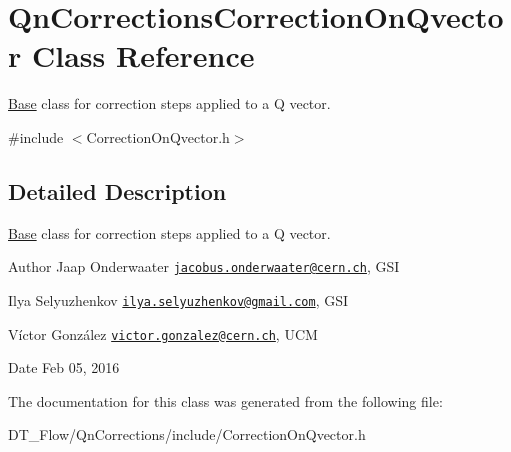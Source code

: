 \hypertarget{classQnCorrectionsCorrectionOnQvector}{}\section{Qn\+Corrections\+Correction\+On\+Qvector Class Reference}
\label{classQnCorrectionsCorrectionOnQvector}


\mbox{\hyperlink{classBase}{Base}} class for correction steps applied to a Q vector.  




{\ttfamily \#include $<$Correction\+On\+Qvector.\+h$>$}



\subsection{Detailed Description}
\mbox{\hyperlink{classBase}{Base}} class for correction steps applied to a Q vector. 

\begin{DoxyAuthor}{Author}
Jaap Onderwaater \href{mailto:jacobus.onderwaater@cern.ch}{\tt jacobus.\+onderwaater@cern.\+ch}, G\+SI 

Ilya Selyuzhenkov \href{mailto:ilya.selyuzhenkov@gmail.com}{\tt ilya.\+selyuzhenkov@gmail.\+com}, G\+SI 

Víctor González \href{mailto:victor.gonzalez@cern.ch}{\tt victor.\+gonzalez@cern.\+ch}, U\+CM 
\end{DoxyAuthor}
\begin{DoxyDate}{Date}
Feb 05, 2016 
\end{DoxyDate}


The documentation for this class was generated from the following file\+:\begin{DoxyCompactItemize}
\item 
D\+T\+\_\+\+Flow/\+Qn\+Corrections/include/Correction\+On\+Qvector.\+h\end{DoxyCompactItemize}
